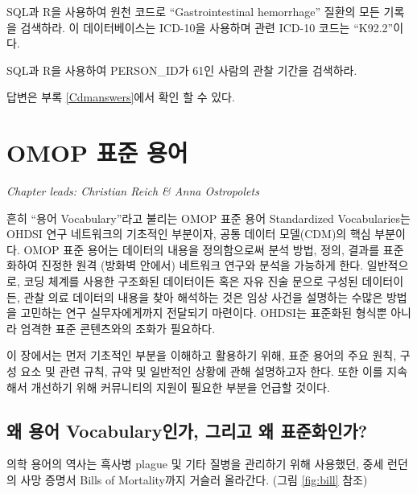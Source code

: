 \documentclass[10.5pt]{book}
\theoremstyle{definition}
\theoremstyle{definition}
\theoremstyle{definition}
\theoremstyle{remark}
\let\BeginKnitrBlock\begin \let\EndKnitrBlock\end
\begin{document}
\BeginKnitrBlock{exercise}
\protect\hypertarget{exr:exercisePersonSource}{}{\label{exr:exercisePersonSource}
}SQL과 R을 사용하여 원천 코드로 ``Gastrointestinal hemorrhage'' 질환의
모든 기록을 검색하라. 이 데이터베이스는 ICD-10을 사용하며 관련 ICD-10
코드는 ``K92.2''이다.
\EndKnitrBlock{exercise}

\BeginKnitrBlock{exercise}
\protect\hypertarget{exr:exercisePerson61Records}{}{\label{exr:exercisePerson61Records}
}SQL과 R을 사용하여 PERSON\_ID가 61인 사람의 관찰 기간을 검색하라.
\EndKnitrBlock{exercise}

답변은 부록 \ref{Cdmanswers}에서 확인 할 수 있다.

\chapter{OMOP 표준 용어}\label{StandardizedVocabularies}


\emph{Chapter leads: Christian Reich \& Anna Ostropolets}

흔히 ``용어 Vocabulary''라고 불리는 OMOP 표준 용어 Standardized
Vocabularies는 OHDSI 연구 네트워크의 기초적인 부분이자, 공통 데이터
모델(CDM)의 핵심 부분이다. OMOP 표준 용어는 데이터의 내용을 정의함으로써
분석 방법, 정의, 결과를 표준화하여 진정한 원격 (방화벽 안에서) 네트워크
연구와 분석을 가능하게 한다. 일반적으로, 코딩 체계를 사용한 구조화된
데이터이든 혹은 자유 진술 문으로 구성된 데이터이든, 관찰 의료 데이터의
내용을 찾아 해석하는 것은 임상 사건을 설명하는 수많은 방법을 고민하는
연구 실무자에게까지 전달되기 마련이다. OHDSI는 표준화된 형식뿐 아니라
엄격한 표준 콘텐츠와의 조화가 필요하다.

이 장에서는 먼저 기초적인 부분을 이해하고 활용하기 위해, 표준 용어의
주요 원칙, 구성 요소 및 관련 규칙, 규약 및 일반적인 상황에 관해
설명하고자 한다. 또한 이를 지속해서 개선하기 위해 커뮤니티의 지원이
필요한 부분을 언급할 것이다.

\section{왜 용어 Vocabulary인가, 그리고 왜
표준화인가?}\label{--vocabulary---}

의학 용어의 역사는 흑사병 plague 및 기타 질병을 관리하기 위해 사용했던,
중세 런던의 사망 증명서 Bills of Mortality까지 거슬러 올라간다. (그림
\ref{fig:bill} 참조) 
\end{document}

